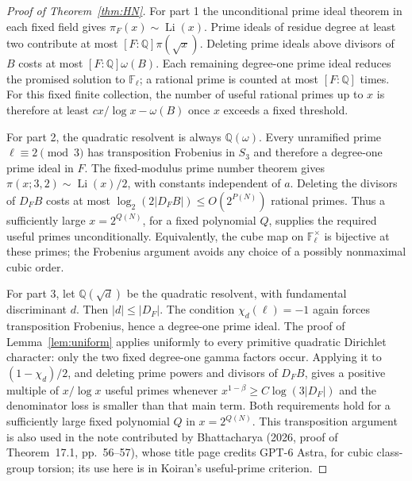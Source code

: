 \documentclass[11pt]{article}
\newcommand{\Q}{\mathbb Q}
\newcommand{\F}{\mathbb F}
\newcommand{\Li}{\operatorname{Li}}
\begin{document}
\begin{proof}[Proof of Theorem~\ref{thm:HN}]
For part 1 the unconditional prime ideal theorem in each fixed field
gives $\pi_F(x)\sim\Li(x)$. Prime ideals of residue degree at least
two contribute at most $[F:\Q]\pi(\sqrt x)$. Deleting prime ideals
above divisors of $B$ costs at most $[F:\Q]\omega(B)$.
Each remaining degree-one prime ideal reduces the promised solution
to $\F_\ell$; a rational prime is counted at most $[F:\Q]$ times.
For this fixed finite collection, the number of useful rational
primes up to $x$ is therefore at least
$c x/\log x-\omega(B)$ once $x$ exceeds a fixed threshold.

For part 2, the quadratic resolvent is always $\Q(\omega)$.
Every unramified prime $\ell\equiv2\pmod3$ has transposition
Frobenius in $S_3$ and therefore a degree-one prime ideal in $F$.
The fixed-modulus prime number theorem gives
$\pi(x;3,2)\sim\Li(x)/2$, with constants independent of $a$.
Deleting the divisors of $D_FB$ costs at most
$\log_2(2|D_FB|)\le O(2^{P(N)})$ rational primes.
Thus a sufficiently large $x=2^{Q(N)}$, for a fixed polynomial
$Q$, supplies the required useful primes unconditionally.
Equivalently, the cube map on $\F_\ell^\times$ is bijective at
these primes; the Frobenius argument avoids any choice of a
possibly nonmaximal cubic order.

For part 3, let $\Q(\sqrt d)$ be the quadratic resolvent, with
fundamental discriminant $d$. Then $|d|\le|D_F|$.
The condition $\chi_d(\ell)=-1$ again forces transposition
Frobenius, hence a degree-one prime ideal.
The proof of Lemma~\ref{lem:uniform} applies uniformly to every
primitive quadratic Dirichlet character: only the two fixed
degree-one gamma factors occur. Applying it to
$(1-\chi_d)/2$, and deleting prime powers and divisors of $D_FB$,
gives a positive multiple of $x/\log x$ useful primes whenever
$x^{1-\beta}\ge C\log(3|D_F|)$ and the denominator loss is smaller
than that main term. Both requirements hold for a sufficiently
large fixed polynomial $Q$ in $x=2^{Q(N)}$.
This transposition argument is also used in the note contributed by
Bhattacharya (2026, proof of Theorem~17.1, pp.~56--57), whose
title page credits GPT-6 Astra, for cubic class-group torsion; its use here
is in Koiran's useful-prime criterion.


\end{proof}
\end{document}
